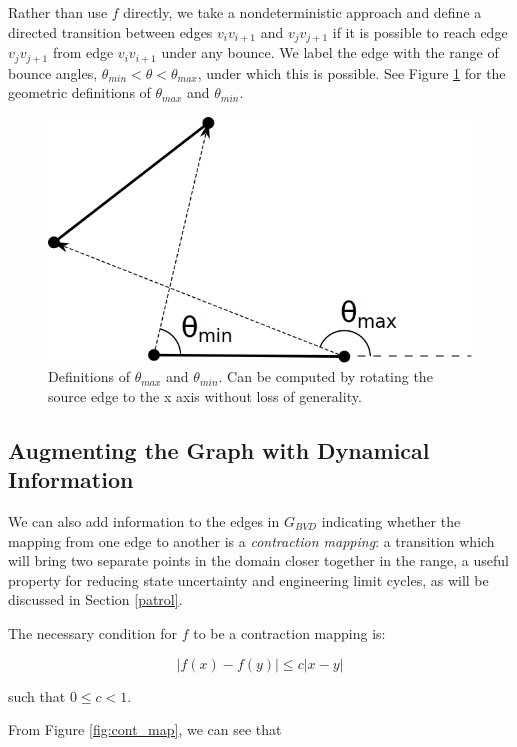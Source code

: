\documentclass[]{styles/svproc}  %
\begin{document}
Rather than use $f$ directly, we take a nondeterministic approach and define a
directed transition between edges $v_i v_{i+1}$ and $v_j v_{j+1}$ if it is
possible to reach edge $v_j v_{j+1}$ from edge $v_i v_{i+1}$ under any bounce.
We label the edge with the range of bounce angles, $\theta_{min} < \theta <
\theta_{max}$, under which this is possible. See Figure \ref{fig:bounce_range} for
the geometric definitions of $\theta_{max}$ and $\theta_{min}$.

\begin{figure}
    \includegraphics[width=0.8\linewidth]{figures/bouncerange.png}
    \centering
    \caption{Definitions of $\theta_{max}$ and $\theta_{min}$. Can be computed
by rotating the source edge to the x axis without loss of generality.}\label{fig:bounce_range}
    \centering
\end{figure}

\subsection{Augmenting the Graph with Dynamical Information}

We can also add information to the edges in $G_{BVD}$ indicating whether the
mapping from one edge to another is a \emph{contraction mapping}: a transition
which will bring two separate points in the domain closer together in the range,
a useful property for reducing state uncertainty and engineering limit cycles,
as will be discussed in Section \ref{patrol}.

The necessary condition for $f$ to be a contraction mapping is:

\begin{equation*}
|f(x) - f(y)| \leq c |x-y|
\end{equation*}

such that $0 \leq c < 1$.

From Figure \ref{fig:cont_map}, we can see that
\end{document}
